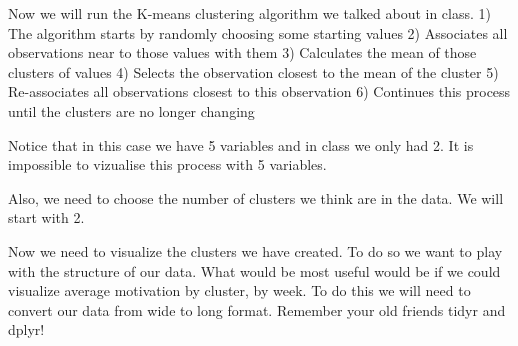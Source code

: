 \documentclass[
]{article}
\newenvironment{Shaded}{\begin{snugshade}}{\end{snugshade}}
\newcommand{\CommentTok}[1]{\textcolor[rgb]{0.56,0.35,0.01}{\textit{#1}}}
\newcommand{\DecValTok}[1]{\textcolor[rgb]{0.00,0.00,0.81}{#1}}
\newcommand{\KeywordTok}[1]{\textcolor[rgb]{0.13,0.29,0.53}{\textbf{#1}}}
\newcommand{\NormalTok}[1]{#1}
\newcommand{\OperatorTok}[1]{\textcolor[rgb]{0.81,0.36,0.00}{\textbf{#1}}}
\newcommand{\StringTok}[1]{\textcolor[rgb]{0.31,0.60,0.02}{#1}}
\begin{document}
Now we will run the K-means clustering algorithm we talked about in
class. 1) The algorithm starts by randomly choosing some starting values
2) Associates all observations near to those values with them 3)
Calculates the mean of those clusters of values 4) Selects the
observation closest to the mean of the cluster 5) Re-associates all
observations closest to this observation 6) Continues this process until
the clusters are no longer changing

Notice that in this case we have 5 variables and in class we only had 2.
It is impossible to vizualise this process with 5 variables.

Also, we need to choose the number of clusters we think are in the data.
We will start with 2.

\begin{Shaded}
\end{Shaded}

Now we need to visualize the clusters we have created. To do so we want
to play with the structure of our data. What would be most useful would
be if we could visualize average motivation by cluster, by week. To do
this we will need to convert our data from wide to long format. Remember
your old friends tidyr and dplyr!
\end{document}
